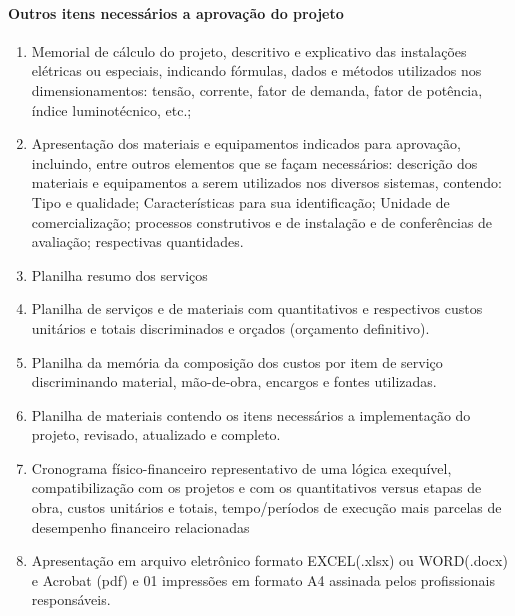 \paragraph{Outros itens necessários a aprovação do projeto}
\begin{enumerate}
	\item Memorial de cálculo do projeto, descritivo e explicativo das instalações elétricas ou especiais, indicando fórmulas, dados e métodos utilizados nos dimensionamentos: tensão, corrente, fator de demanda, fator de potência, índice luminotécnico, etc.;

	\item Apresentação dos materiais e equipamentos indicados para aprovação, incluindo, entre outros elementos que se façam necessários: descrição dos materiais e equipamentos a serem utilizados nos diversos sistemas, contendo: Tipo e qualidade; Características para sua identificação; Unidade de comercialização; processos construtivos e de instalação e de conferências de avaliação; respectivas quantidades.

	\item Planilha resumo dos serviços

	\item Planilha de serviços e de materiais com quantitativos e respectivos custos unitários e totais discriminados e orçados (orçamento definitivo).

	\item Planilha da memória da composição dos custos por item de serviço discriminando material, mão-de-obra, encargos e fontes utilizadas.

	\item Planilha de materiais contendo os itens necessários a implementação do projeto, revisado, atualizado e completo.
	
	\item Cronograma físico-financeiro representativo de uma lógica exequível, compatibilização com os projetos e com os quantitativos versus etapas de obra, custos unitários e totais, tempo/períodos de execução mais parcelas de desempenho financeiro relacionadas
	
	\item Apresentação em arquivo eletrônico formato EXCEL(.xlsx) ou WORD(.docx) e Acrobat (pdf) e 01 impressões em formato A4 assinada pelos profissionais responsáveis.

\end{enumerate}